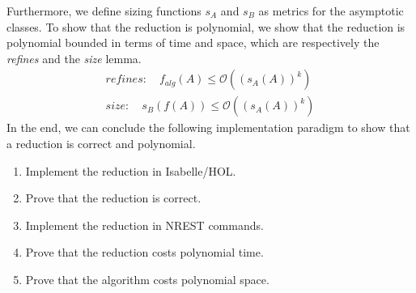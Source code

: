 Furthermore, we define sizing functions $s_A$ and $s_B$ as metrics for the asymptotic classes.
To show that the reduction is polynomial, we show that the reduction is polynomial bounded in terms 
of time and space, which are respectively the \textit{refines} and the \textit{size} lemma.
\begin{align*}
    refines: \quad f_{alg}(A) \leq \mathcal{O}((s_A(A))^k) \\
    size: \quad s_B (f(A)) \leq \mathcal{O}((s_A(A))^k)
\end{align*}
In the end, we can conclude the following implementation paradigm to show that a reduction is correct and polynomial.
\begin{enumerate}
    \item Implement the reduction in Isabelle/HOL.
    \item Prove that the reduction is correct.
    \item Implement the reduction in NREST commands.
    \item Prove that the reduction costs polynomial time.
    \item Prove that the algorithm costs polynomial space.
\end{enumerate}
